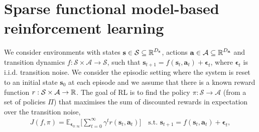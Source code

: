 \documentclass{article}
\newcommand{\state}{\ensuremath{\mathbf{s}}}
\newcommand{\action}{\ensuremath{\mathbf{a}}}
\newcommand{\noise}{\ensuremath{\bm\epsilon}}
\newcommand{\discount}{\ensuremath{\gamma}}
\newcommand{\stateDomain}{\ensuremath{\mathcal{S}}}
\newcommand{\actionDomain}{\ensuremath{\mathcal{A}}}
\newcommand{\policyDomain}{\ensuremath{\Pi}}
\newcommand{\rewardFn}{\ensuremath{r}}
\newcommand{\transitionFn}{\ensuremath{f}}
\newcommand{\policy}{\ensuremath{\pi}}
\begin{document}
\section{Sparse functional model-based reinforcement learning}
\label{app:rl}

We consider environments with states \(\state \in \stateDomain \subseteq \R^{D_{\state}} \),
actions \(\action \in \actionDomain \subseteq \R^{D_{\action}}\) and transition dynamics
\(\transitionFn: \stateDomain \times \actionDomain \rightarrow \stateDomain \), such that
$\state_{t+1} = \transitionFn(\state_{t}, \action_{t}) + \noise_{t}$, where  $\noise_{t}$
is i.i.d. transition noise.
We consider the episodic setting where the system is reset to an initial state $\state_{0}$ at each episode and we
assume that there is a known reward function $r : \stateDomain \times \actionDomain \rightarrow \R$.
The goal of RL is to find the policy \(\pi : \stateDomain \rightarrow \actionDomain\)
(from a set of policies $\Pi$) that maximises the sum of discounted rewards
in expectation over the transition noise,
\begin{align} \label{eq-model-free-objective}
J(\transitionFn, \policy) = \mathbb{E}_{\noise_{0:\infty}} \bigg[ \sum_{t=0}^{\infty} \discount^{t} \rewardFn(\state_{t},\action_{t}) \bigg]
\quad \text{s.t. } \state_{t+1} = \transitionFn(\state_{t}, \action_{t}) + \noise_{t},
\end{align}
\end{document}
